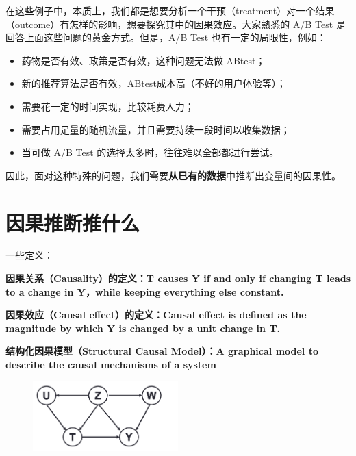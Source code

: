 \documentclass[12pt]{article}
\begin{document}
在这些例子中，本质上，我们都是想要分析一个干预（treatment）对一个结果（outcome）有怎样的影响，想要探究其中的因果效应。大家熟悉的 A/B Test 是回答上面这些问题的黄金方式。但是，A/B Test 也有一定的局限性，例如：
\begin{itemize}
\setlength{\itemsep}{0pt}
\setlength{\parsep}{0pt}
\setlength{\parskip}{0pt}
    \item 药物是否有效、政策是否有效，这种问题无法做 ABtest；
    \item 新的推荐算法是否有效，ABtest成本高（不好的用户体验等）；
    \item 需要花一定的时间实现，比较耗费人力；
    \item 需要占用足量的随机流量，并且需要持续一段时间以收集数据；
    \item 当可做 A/B Test 的选择太多时，往往难以全部都进行尝试。
\end{itemize}

因此，面对这种特殊的问题，我们需要\textbf{从已有的数据}中推断出变量间的因果性。

\section{因果推断推什么}
\begin{mdframed}[
linecolor=black!40,outerlinewidth=1pt,roundcorner=.5em,innertopmargin=1ex,innerbottommargin=.5\baselineskip,innerrightmargin=1em,innerleftmargin=1em,backgroundcolor=gray!5,
]
一些定义：

\textbf{因果关系（Causality）的定义：T causes Y if and only if changing T leads to a change in Y，while keeping everything else constant. \cite{Causal_Inference_and_Stable_Learning}}

\textbf{因果效应（Causal effect）的定义：Causal effect is defined as the magnitude by which Y is changed by a unit change in T.}

\textbf{结构化因果模型（Structural Causal Model）：A graphical model to describe the causal mechanisms of a system}
\begin{figure}[H]
    \centering
    \includegraphics[width=0.5\textwidth]{fig/Causal_Inference_and_Stable_Learning-Causal-Model.png}
\end{figure}
\end{mdframed}
\end{document}
